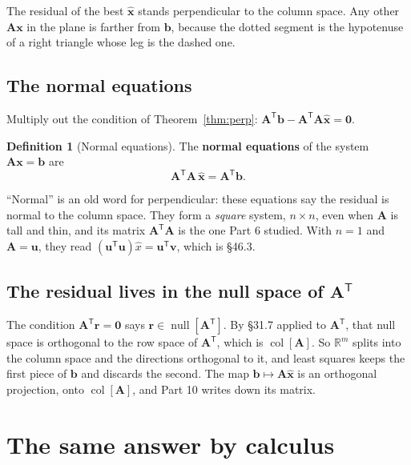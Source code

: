 \documentclass[11pt]{article}
\theoremstyle{plain}
\theoremstyle{definition}
\newtheorem{defn}{Definition}[section]
\theoremstyle{remark}
\newcommand{\R}{\mathbb{R}}
\newcommand{\vc}[1]{\mathbf{#1}}
\newcommand{\mt}[1]{\mathbf{#1}}
\newcommand{\T}{^{\mathsf{T}}}
\newcommand{\colsp}[1]{\operatorname{col}[#1]}
\newcommand{\nullsp}[1]{\operatorname{null}[#1]}
\newcommand{\xh}{\hat{\vc{x}}}
\begin{document}
\noindent The residual of the best $\xh$ stands perpendicular to the column
space. Any other $\mt{A}\vc{x}$ in the plane is farther from $\vc{b}$, because the
dotted segment is the hypotenuse of a right triangle whose leg is the dashed one.

\subsection{The normal equations}
Multiply out the condition of Theorem~\ref{thm:perp}:
$\mt{A}\T\vc{b}-\mt{A}\T\mt{A}\xh=\vc{0}$.

\begin{defn}[Normal equations]
The \textbf{normal equations} of the system $\mt{A}\vc{x}=\vc{b}$ are
\[
  \boxed{\;\mt{A}\T\mt{A}\,\xh=\mt{A}\T\vc{b}.\;}
\]
\end{defn}

\noindent ``Normal'' is an old word for perpendicular: these equations say the
residual is normal to the column space. They form a \emph{square} system,
$n\times n$, even when $\mt{A}$ is tall and thin, and its matrix $\mt{A}\T\mt{A}$
is the one Part 6 studied. With $n=1$ and $\mt{A}=\vc{u}$, they read
$(\vc{u}\T\vc{u})\hat x=\vc{u}\T\vc{v}$, which is \S46.3.

\subsection{The residual lives in the null space of \texorpdfstring{$\mt{A}\T$}{A'}}
The condition $\mt{A}\T\vc{r}=\vc{0}$ says $\vc{r}\in\nullsp{\mt{A}\T}$. By
\S31.7 applied to $\mt{A}\T$, that null space is orthogonal to the row space of
$\mt{A}\T$, which is $\colsp{\mt{A}}$. So $\R^{m}$ splits into the column space
and the directions orthogonal to it, and least squares keeps the first piece of
$\vc{b}$ and discards the second. The map $\vc{b}\mapsto\mt{A}\xh$ is an
orthogonal projection, onto $\colsp{\mt{A}}$, and Part 10 writes down its
matrix.

\section{The same answer by calculus}
\end{document}

